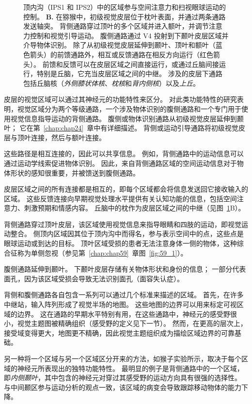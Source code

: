 \begin{figure}[htbp]
{		顶内沟（IPS1 和 IPS2）中的区域参与空间注意力和扫视眼球运动的控制。
		\textbf{B.} 在猕猴中，初级视觉皮层位于枕叶表面，并通过两条通路发送轴突。
		背侧通路穿过顶叶的多个区域并进入额叶，并调节注意力控制和视觉引导运动。
		腹侧通路通过 V4 投射到下颞叶皮层区域并介导物体识别。
		除了从初级视觉皮层延伸到颞叶、顶叶和额叶（蓝色箭头）的前馈通路外，相互或反馈通路在相反方向运行（红色箭头）。
		前馈和反馈可以在皮层区域之间直接运行，或通过丘脑间接运行，特别是丘脑，它充当皮层区域之间的中继。 
		涉及的皮层下通路包括丘脑核（\textit{外侧膝状体核}、\textit{枕核}和\textit{背内侧核}）以及\textit{上丘}。}
	\label{fig:21_7}
\end{figure}


皮层的视觉区域可以通过其神经元的功能特性来区分。
对此类功能特性的研究表明，视觉区域分为两个等级通路，一个涉及物体识别的腹侧通路和一个专门用于使用视觉信息指导运动的背侧通路。
腹侧或物体识别通路从初级视觉皮层延伸到颞叶；
它在第~\ref{chap:chap24}~章中有详细描述。
背侧或运动引导通路将初级视觉皮层与顶叶连接，然后与额叶连接。


这些路径是相互连接的，因此可以共享信息。
例如，背侧通路中的运动信息可以通过运动学线索促进物体识别。
因此，来自背侧通路区域的空间运动信息对于物体形状的感知很重要，并被馈送到腹侧通路。


皮层区域之间的所有连接都是相互的，即每个区域都会将信息发送回它接收输入的区域。
这些反馈连接向早期视觉处理水平提供有关认知功能的信息，包括空间注意力、刺激预期和情感内容。
丘脑中的枕作为皮层区域之间的中继（见图~\ref{fig:21_7}B）。


背侧通路穿过顶叶皮层，该区域使用视觉信息来指导眼睛和四肢的运动，即视觉运动整合。
侧顶内区域因其位于顶内沟中而得名，参与表示空间中的点，这些点是眼球运动或到达的目标。
顶叶区域受损的患者无法注意身体一侧的物体，这种综合征称为单侧忽视（参见第~\ref{chap:chap59}~章图~\ref{fig:59_1}）。


腹侧通路延伸到颞叶。
下颞叶皮层存储有关物体形状和身份的信息；
一部分代表面孔，因为该区域受损会导致无法识别面孔（面容失认症）。


背侧和腹侧通路各自包含一系列可以通过几个标准来描述的区域。
首先，在许多中继站，输入阵列形成了视觉半场的地图。 
这些地图的边界可以用来标定可视区域的边界。
这在通路的早期水平特别有用，在这些通路中，神经元的感受野很小，视觉主题图被精确组织（感受野的定义见下一节）。
然而，在更高的层次上，接受域变得更大，地图更不精确，因此视觉主题组织成为描绘区域边界的可靠基础。


另一种将一个区域与另一个区域区分开来的方法，如猴子实验所示，取决于每个区域的神经元所表现出的独特功能特性。
最明显的例子是背侧通路中的一个区域，即\textit{内侧颞叶}，其中包含的神经元对穿过其感受野的运动方向具有很强的选择性。
与中间颞区参与运动分析的观点一致，该区域的病变会导致跟踪移动物体的能力下降。


